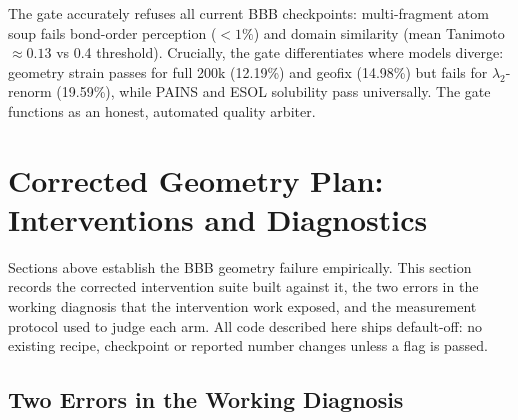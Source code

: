 \documentclass[12pt, a4paper]{article}
\begin{document}
\begin{table}[H]
\centering
\small
\caption{End-to-End Lab-Readiness Gate Validation on BBB Model Checkpoints.}
\label{tab:gate_results}
\end{table}

The gate accurately refuses all current BBB checkpoints: multi-fragment atom soup fails bond-order perception ($<1\%$) and domain similarity (mean Tanimoto $\approx 0.13$ vs 0.4 threshold). Crucially, the gate differentiates where models diverge: geometry strain passes for full 200k (12.19\%) and geofix (14.98\%) but fails for $\lambda_2$-renorm (19.59\%), while PAINS and ESOL solubility pass universally. The gate functions as an honest, automated quality arbiter.

\section{Corrected Geometry Plan: Interventions and Diagnostics}
\label{sec:geometry_plan}

Sections above establish the BBB geometry failure empirically. This section
records the corrected intervention suite built against it, the two errors in the
working diagnosis that the intervention work exposed, and the measurement
protocol used to judge each arm. All code described here ships default-off: no
existing recipe, checkpoint or reported number changes unless a flag is passed.

\subsection{Two Errors in the Working Diagnosis}
\end{document}
